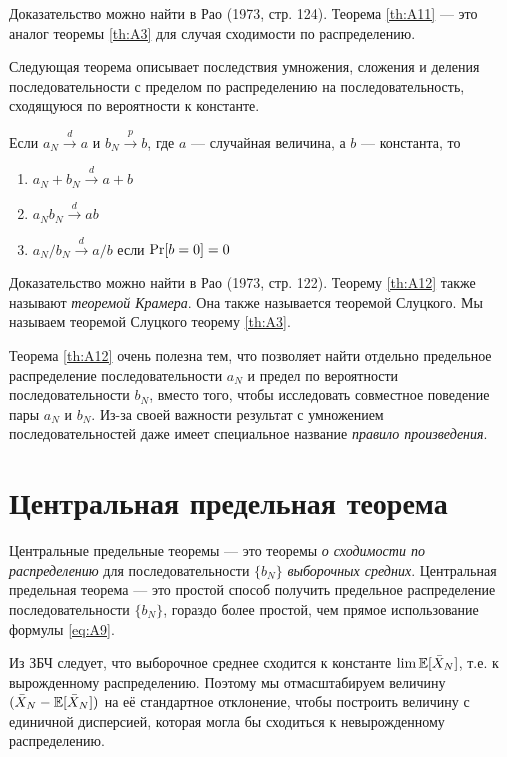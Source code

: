 Доказательство можно найти в Рао (1973, стр. 124). Теорема \ref{th:A11} --- это аналог теоремы \ref{th:A3} для случая сходимости по распределению.

Следующая теорема описывает последствия умножения, сложения и деления последовательности с пределом по распределению на последовательность, сходящуюся по вероятности к константе.

\begin{theorem}
\label{th:A12}
Если $a_N \overset{d}{\to} a$ и $b_N \overset{p}{\to} b$, где $a$ --- случайная величина, а $b$ --- константа, то

\begin{enumerate}
\item $a_N+b_N \overset{d}{\to} a+ b$ 
\item $a_Nb_N \overset{d}{\to} a b$ 
\item $a_N/b_N \overset{d}{\to} a/ b$ если $\P[b=0]=0$
\end{enumerate}
\end{theorem}

Доказательство можно найти в Рао (1973, стр. 122). Теорему \ref{th:A12} также называют \textit{теоремой Крамера}. Она также называется теоремой Слуцкого. Мы называем теоремой Слуцкого теорему \ref{th:A3}.

Теорема \ref{th:A12} очень полезна тем, что позволяет найти отдельно предельное распределение последовательности $a_N$ и предел по вероятности последовательности $b_N$, вместо того, чтобы исследовать совместное поведение пары $a_N$ и $b_N$. Из-за своей важности результат с умножением последовательностей даже имеет специальное название \textit{правило произведения}.

\section{Центральная предельная теорема}

Центральные предельные теоремы --- это теоремы \textit{о сходимости по распределению} для последовательности $\{b_N\}$  \textit{выборочных средних}. Центральная предельная теорема --- это простой способ получить предельное распределение последовательности $\{b_N\}$, гораздо более простой, чем прямое использование формулы \ref{eq:A9}.

Из ЗБЧ следует, что выборочное среднее сходится к константе $\lim \E[\bar{X}_N]$, т.е. к вырожденному распределению. Поэтому мы отмасштабируем величину $(\bar{X}_N-\E[\bar{X}_N])$ на её стандартное отклонение, чтобы построить величину с единичной дисперсией, которая могла бы сходиться к невырожденному распределению.

